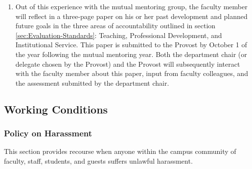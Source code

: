 \begin{enumerate}[label=\alph*)]
{\begin{enumerate}[label=\arabic*)]
						\item{ Out of this experience with the mutual mentoring group, the faculty
							member will reflect in a three-page paper on his or her past development and
							planned future goals in the three areas of accountability outlined in
							section
							\ref{sec:Evaluation-Standards}: Teaching, Professional Development, and Institutional Service. This
							paper is submitted to the Provost by October 1 of the year following the mutual
							mentoring year. Both the department chair (or delegate chosen by the Provost)
							and the Provost will subsequently interact with the faculty member about this
							paper, input from faculty colleagues, and the assessment submitted by the
							department chair. }
					\end{enumerate}
				}
			\end{enumerate}
	\subsection{Working Conditions}
		\subsubsection{Policy on Harassment}
			\label{sec:PolicyOnHarassment}

			This section provides recourse when anyone within the campus community of
			faculty, staff, students, and guests suffers unlawful harassment.

